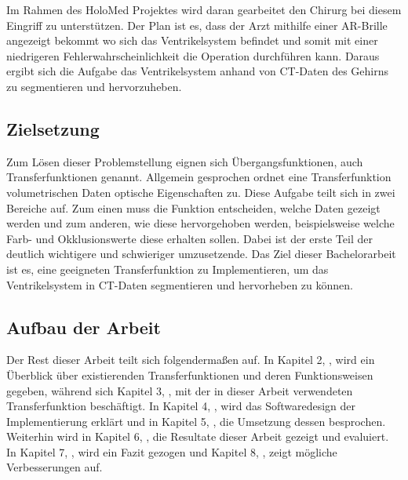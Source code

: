 Im Rahmen des HoloMed Projektes wird daran gearbeitet den Chirurg bei diesem Eingriff zu unterstützen. Der Plan ist es, dass der Arzt mithilfe einer AR-Brille angezeigt bekommt wo sich das Ventrikelsystem befindet und somit mit einer niedrigeren Fehlerwahrscheinlichkeit die Operation durchführen kann. Daraus ergibt sich die Aufgabe das Ventrikelsystem anhand von CT-Daten des Gehirns zu segmentieren und hervorzuheben.



\subsection{Zielsetzung}

Zum Lösen dieser Problemstellung eignen sich Übergangsfunktionen, auch Transferfunktionen genannt. Allgemein gesprochen ordnet eine Transferfunktion volumetrischen Daten optische Eigenschaften zu. Diese Aufgabe teilt sich in zwei Bereiche auf. Zum einen muss die Funktion entscheiden, welche Daten gezeigt werden und zum anderen, wie diese hervorgehoben werden, beispielsweise welche Farb- und Okklusionswerte diese erhalten sollen. Dabei ist der erste Teil der deutlich wichtigere und schwieriger umzusetzende.
\newline
Das Ziel dieser Bachelorarbeit ist es, eine geeigneten Transferfunktion zu Implementieren, um das Ventrikelsystem in CT-Daten segmentieren und hervorheben zu können.



\subsection{Aufbau der Arbeit}

Der Rest dieser Arbeit teilt sich folgendermaßen auf. In Kapitel 2, , wird ein Überblick über existierenden Transferfunktionen und deren Funktionsweisen gegeben, während sich Kapitel 3, , mit der in dieser Arbeit verwendeten Transferfunktion beschäftigt. In Kapitel 4, , wird das Softwaredesign der Implementierung erklärt und in Kapitel 5, , die Umsetzung dessen besprochen. Weiterhin wird in Kapitel 6, , die Resultate dieser Arbeit gezeigt und evaluiert. In Kapitel 7, , wird ein Fazit gezogen und Kapitel 8, , zeigt mögliche Verbesserungen auf.
